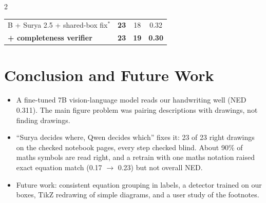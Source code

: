 \documentclass[a0,portrait]{a0poster}
\newcommand{\good}[1]{\textbf{\color{DarkGreen}#1}}
\begin{document}
\begin{minipage}[c]{\linewidth}
\begin{framed}
\begin{multicols}{2}
\begin{center}
{\begin{tabular}{|l|c|c|c|}
B + Surya 2.5 + shared-box fix$^{*}$ & \good{23} & 18 & 0.32 \\
\textbf{+ completeness verifier} & \good{23} & \textbf{19} & \textbf{0.30} \\
\hline
\end{tabular}}
\end{center}
\begin{center}
\end{center}

\section*{Conclusion and Future Work}
\begin{itemize}
	\item A fine-tuned 7B vision-language model reads our handwriting well (NED 0.311). The main figure
	problem was pairing descriptions with drawings, not finding drawings.
	\item ``Surya decides where, Qwen decides which'' fixes it: 23 of 23 right drawings on the checked
	notebook pages, every step checked blind. About 90\% of maths symbols are read right, and a retrain
	with one maths notation raised exact equation match (0.17 $\to$ 0.23) but not overall NED.
	\item Future work: consistent equation grouping in labels, a detector trained on our boxes, TikZ
	redrawing of simple diagrams, and a user study of the footnotes.
\end{itemize}


\end{multicols}
\end{framed}
\end{minipage}
\end{document}
